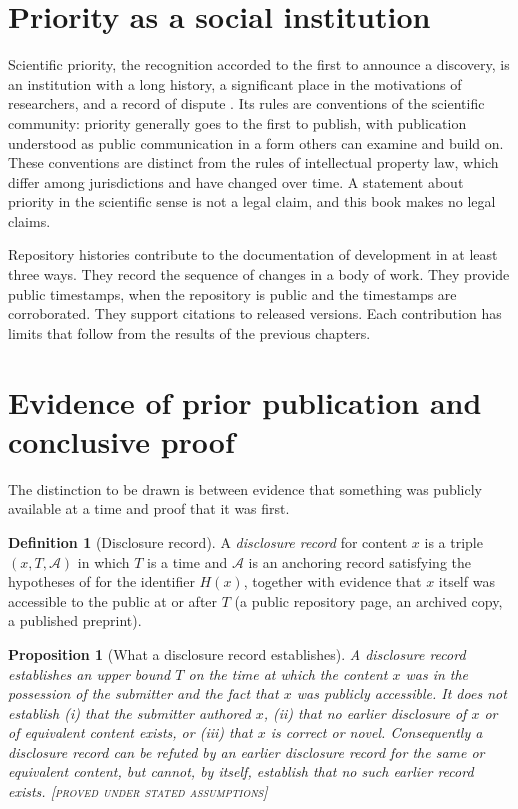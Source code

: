 \documentclass[11pt,twoside,openright]{book}
\theoremstyle{plain}
\newtheorem{proposition}[theorem]{Proposition}
\theoremstyle{definition}
\newtheorem{definition}[theorem]{Definition}
\theoremstyle{remark}
\newcommand{\Proved}{\textup{\textsc{[proved under stated assumptions]}}}
\begin{document}
\section{Priority as a social institution}

Scientific priority, the recognition accorded to the first to announce a discovery, is an institution with a long history, a significant place in the motivations of researchers, and a record of dispute \cite{merton1957}. Its rules are conventions of the scientific community: priority generally goes to the first to publish, with publication understood as public communication in a form others can examine and build on. These conventions are distinct from the rules of intellectual property law, which differ among jurisdictions and have changed over time. A statement about priority in the scientific sense is not a legal claim, and this book makes no legal claims.

Repository histories contribute to the documentation of development in at least three ways. They record the sequence of changes in a body of work. They provide public timestamps, when the repository is public and the timestamps are corroborated. They support citations to released versions. Each contribution has limits that follow from the results of the previous chapters.

\section{Evidence of prior publication and conclusive proof}

The distinction to be drawn is between evidence that something was publicly available at a time and proof that it was first.

\begin{definition}[Disclosure record]\label{def:disclosure}
A \emph{disclosure record} for content $x$ is a triple $(x,T,\mathcal{A})$ in which $T$ is a time and $\mathcal{A}$ is an anchoring record satisfying the hypotheses of  for the identifier $H(x)$, together with evidence that $x$ itself was accessible to the public at or after $T$ (a public repository page, an archived copy, a published preprint).
\end{definition}

\begin{proposition}[What a disclosure record establishes]\label{prop:disclosure}
A disclosure record establishes an upper bound $T$ on the time at which the content $x$ was in the possession of the submitter and the fact that $x$ was publicly accessible. It does not establish (i) that the submitter authored $x$, (ii) that no earlier disclosure of $x$ or of equivalent content exists, or (iii) that $x$ is correct or novel. Consequently a disclosure record can be refuted by an earlier disclosure record for the same or equivalent content, but cannot, by itself, establish that no such earlier record exists.
\Proved{}
\end{proposition}
\end{document}
